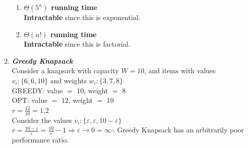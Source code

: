 \documentclass[11pt]{article}
\begin{document}
\begin{enumerate}
\begin{enumerate}
		\item			
			\textbf{\textit{$ \Theta(5^n) $} running time} \\
				\hspace*{.5cm} 
				\textbf{Intractable} since this is exponential. \\
				
		\item
			\textbf{\textit{$ \Theta(n!) $} running time} \\
				\hspace*{.5cm} 
				\textbf{Intractable} since this is factorial. \\		

		\end{enumerate}
		
	\item
		\textbf{\textit{Greedy Knapsack}} \\
			\hspace*{.5cm}
			Consider a knapsack with capacity $ W = 10 $, and items with values $ v_i: \{6, 6,10\} $ and weights $ w_i: \{3, 7, 8\} $ \\
			\hspace*{.5cm}
			GREEDY: value $ = $ 10, weight $ = $ 8 \\
			\hspace*{.5cm}
			OPT: value $ = $ 12, weight $ = $ 10 \\
			\hspace*{.5cm}
			$ r = \frac{12}{10} = 1.2 $ \\ 
			
			\hspace*{.5cm}
			Consider the values $ v_i: \{\varepsilon, \varepsilon, 10-\varepsilon\} $ \\
			\hspace*{.5cm}
			$ r = \frac{10-\varepsilon}{\varepsilon} = \frac{10}{\varepsilon} - 1 \Rightarrow \varepsilon \rightarrow 0 = \infty \therefore $ Greedy Knapsack has an arbitrarily poor performance ratio. \\

\end{enumerate}
\end{document}
